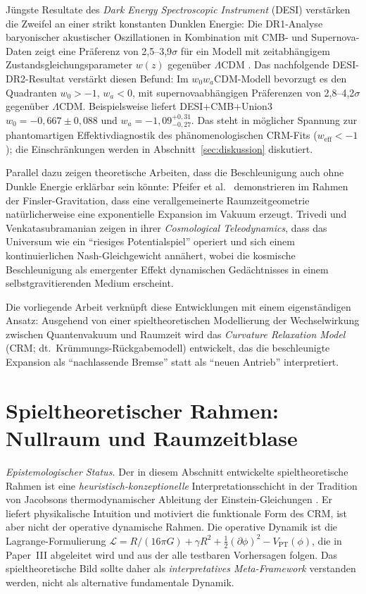 \documentclass[aps,prd,twocolumn,superscriptaddress,nofootinbib]{revtex4-2}
\begin{document}
Jüngste Resultate des \textit{Dark Energy Spectroscopic Instrument} (DESI) verstärken die Zweifel an einer strikt konstanten Dunklen Energie: Die DR1-Analyse baryonischer akustischer Oszillationen in Kombination mit CMB- und Supernova-Daten zeigt eine Präferenz von 2,5--3,9$\sigma$ für ein Modell mit zeitabhängigem Zustandsgleichungsparameter $w(z)$ gegenüber $\Lambda$CDM \cite{DESI2024}. Das nachfolgende DESI-DR2-Resultat \cite{DESI2025} verstärkt diesen Befund: Im $w_0w_a$CDM-Modell bevorzugt es den Quadranten $w_0>-1$, $w_a<0$, mit supernovaabhängigen Präferenzen von 2,8--4,2$\sigma$ gegenüber $\Lambda$CDM. Beispielsweise liefert DESI+CMB+Union3 $w_0=-0{,}667\pm0{,}088$ und $w_a=-1{,}09^{+0{,}31}_{-0{,}27}$. Das steht in möglicher Spannung zur phantomartigen Effektivdiagnostik des phänomenologischen CRM-Fits ($w_\mathrm{eff}< -1$); die Einschränkungen werden in Abschnitt~\ref{sec:diskussion} diskutiert.

Parallel dazu zeigen theoretische Arbeiten, dass die Beschleunigung auch ohne Dunkle Energie erkl\"arbar sein k\"onnte: Pfeifer et al.\ \cite{Pfeifer2025} demonstrieren im Rahmen der Finsler-Gravitation, dass eine verallgemeinerte Raumzeitgeometrie nat\"urlicherweise eine exponentielle Expansion im Vakuum erzeugt. Trivedi und Venkatasubramanian \cite{Trivedi2025} zeigen in ihrer \textit{Cosmological Teleodynamics}, dass das Universum wie ein ``riesiges Potentialspiel'' operiert und sich einem kontinuierlichen Nash-Gleichgewicht ann\"ahert, wobei die kosmische Beschleunigung als emergenter Effekt dynamischen Ged\"achtnisses in einem selbstgravitierenden Medium erscheint.

Die vorliegende Arbeit verknüpft diese Entwicklungen mit einem eigenständigen Ansatz: Ausgehend von einer spieltheoretischen Modellierung der Wechselwirkung zwischen Quantenvakuum und Raumzeit wird das \textit{Curvature Relaxation Model} (CRM; dt.\ Krümmungs-Rückgabemodell) entwickelt, das die beschleunigte Expansion als ``nachlassende Bremse'' statt als ``neuen Antrieb'' interpretiert.

\section{Spieltheoretischer Rahmen: Nullraum und Raumzeitblase}
\label{sec:spieltheorie}

\textit{Epistemologischer Status.} Der in diesem Abschnitt entwickelte spieltheoretische Rahmen ist eine \emph{heuristisch-konzeptionelle} Interpretationsschicht in der Tradition von Jacobsons thermodynamischer Ableitung der Einstein-Gleichungen \cite{Jacobson1995}. Er liefert physikalische Intuition und motiviert die funktionale Form des CRM, ist aber nicht der operative dynamische Rahmen. Die operative Dynamik ist die Lagrange-Formulierung $\mathcal{L} = R/(16\pi G) + \gamma R^2 + \frac{1}{2}(\partial\phi)^2 - V_{\mathrm{PT}}(\phi)$, die in Paper~III \cite{Geiger2026c} abgeleitet wird und aus der alle testbaren Vorhersagen folgen. Das spieltheoretische Bild sollte daher als \emph{interpretatives Meta-Framework} verstanden werden, nicht als alternative fundamentale Dynamik.
\end{document}
